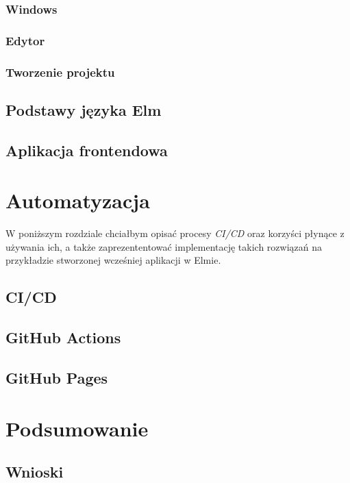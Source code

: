 \documentclass[twoside,a4paper]{report}
\begin{document}
\subsection{Windows}

\subsection{Edytor}

\subsection{Tworzenie projektu}

\section{Podstawy języka Elm}

\section{Aplikacja frontendowa}


\chapter{Automatyzacja}
W poniższym rozdziale chciałbym opisać procesy \textit{CI/CD} oraz korzyści płynące z używania ich, a także zaprezententować implementację takich rozwiązań na przykładzie stworzonej wcześniej aplikacji w Elmie.

\section{CI/CD}

\section{GitHub Actions}

\section{GitHub Pages}


\chapter{Podsumowanie}

\section{Wnioski}


\listoffigures
\lstlistoflistings

\printbibliography

\end{document}
